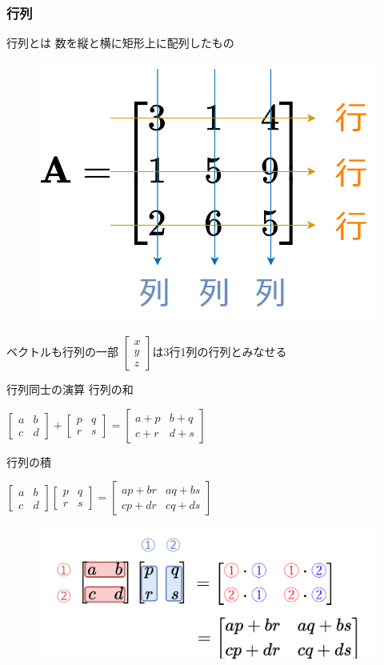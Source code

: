 \documentclass[dvipdfmx,aspectratio=169]{beamer}
\begin{document}
	\subsubsection{行列}
	\begin{frame}{行列とは}
		数を縦と横に矩形上に配列したもの
		\begin{figure}
			\centering
			\includegraphics[width=0.4\linewidth]{img/example-of-matrix}
		\end{figure}
	\end{frame}
	\begin{frame}{ベクトルも行列の一部}
		$ \begin{bmatrix}
			x\\ y\\ z
		\end{bmatrix} $は3行1列の行列とみなせる
	\end{frame}
	\begin{frame}{行列同士の演算}
		行列の和
		
		$ \begin{bmatrix}
			a&b\\
			c&d
		\end{bmatrix} + \begin{bmatrix}
			p&q\\
			r&s
		\end{bmatrix} = \begin{bmatrix}
			a+p & b+q\\
			c+r & d+s
		\end{bmatrix} $
		
		行列の積
		
		$ \begin{bmatrix}
			a&b\\
			c&d
		\end{bmatrix}\begin{bmatrix}
			p&q\\
			r&s
		\end{bmatrix} = \begin{bmatrix}
			ap+br & aq+bs\\
			cp+dr & cq+ds
		\end{bmatrix} $
	
		\begin{figure}
			\centering
			\includegraphics[width=0.5\linewidth]{img/product-of-matrices}
		\end{figure}
		
	\end{frame}
\end{document}
